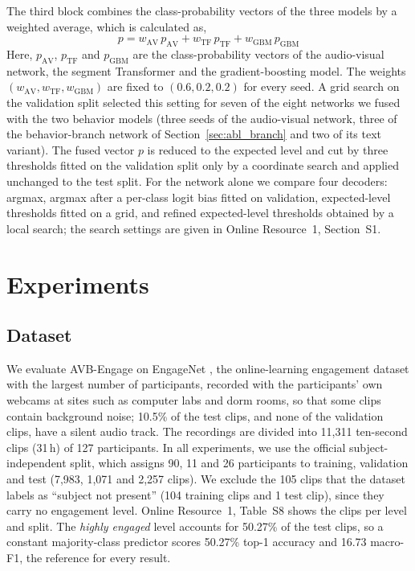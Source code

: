 \documentclass[pdflatex,iicol,sn-basic]{sn-jnl}
\newcommand{\ournet}{AVB-Engage}
\begin{document}
The third block combines the class-probability vectors of the three models by a weighted average, which is calculated as,
\begin{equation}
p = w_{\mathrm{AV}}\, p_{\mathrm{AV}} + w_{\mathrm{TF}}\, p_{\mathrm{TF}} + w_{\mathrm{GBM}}\, p_{\mathrm{GBM}} \label{eq:late}
\end{equation}
Here, $p_{\mathrm{AV}}$, $p_{\mathrm{TF}}$ and $p_{\mathrm{GBM}}$ are the class-probability vectors of the audio-visual network, the segment Transformer and the gradient-boosting model. The weights $(w_{\mathrm{AV}}, w_{\mathrm{TF}}, w_{\mathrm{GBM}})$ are fixed to $(0.6, 0.2, 0.2)$ for every seed. A grid search on the validation split selected this setting for seven of the eight networks we fused with the two behavior models (three seeds of the audio-visual network, three of the behavior-branch network of Section~\ref{sec:abl_branch} and two of its text variant). The fused vector $p$ is reduced to the expected level and cut by three thresholds fitted on the validation split only by a coordinate search and applied unchanged to the test split. For the network alone we compare four decoders: argmax, argmax after a per-class logit bias fitted on validation, expected-level thresholds fitted on a grid, and refined expected-level thresholds obtained by a local search; the search settings are given in Online Resource~1, Section~S1.

\section{Experiments}\label{sec:exp}

\subsection{Dataset}\label{sec:dataset}

We evaluate \ournet{} on EngageNet \citep{singh2023engagenet}, the online-learning engagement dataset with the largest number of participants, recorded with the participants' own webcams at sites such as computer labs and dorm rooms, so that some clips contain background noise; 10.5\% of the test clips, and none of the validation clips, have a silent audio track. The recordings are divided into 11,311 ten-second clips (31\,h) of 127 participants. In all experiments, we use the official subject-independent split, which assigns 90, 11 and 26 participants to training, validation and test (7,983, 1,071 and 2,257 clips). We exclude the 105 clips that the dataset labels as ``subject not present'' (104 training clips and 1 test clip), since they carry no engagement level. Online Resource~1, Table~S8 shows the clips per level and split. The \emph{highly engaged} level accounts for 50.27\% of the test clips, so a constant majority-class predictor scores 50.27\% top-1 accuracy and 16.73 macro-F1, the reference for every result.
\end{document}
